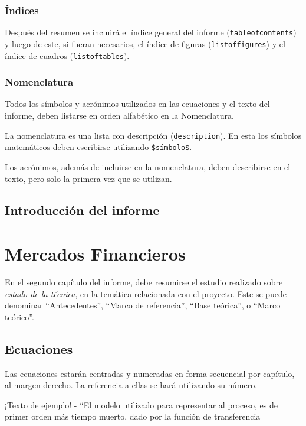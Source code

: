 \subsection{Índices}
Después del resumen se incluirá el índice general  del informe (\texttt{tableofcontents}) y luego de este, si fueran necesarios, el índice de figuras (\texttt{listoffigures}) y el índice de cuadros (\texttt{listoftables}).

\subsection{Nomenclatura}
Todos los símbolos y acrónimos utilizados en las ecuaciones y el texto del informe, deben listarse en orden alfabético en la Nomenclatura.

La nomenclatura es una lista con descripción (\texttt{description}).  En esta los símbolos matemáticos deben escribirse utilizando \texttt{\$símbolo\$}.

Los acrónimos, además de incluirse en la nomenclatura, deben describirse en el texto, pero solo la primera vez que se utilizan.

\section{Introducción del informe}


\chapter{Mercados Financieros} \label{sec:L02}
En el segundo capítulo del informe, debe resumirse el estudio realizado sobre \emph{estado de la técnica}, en la temática relacionada con el proyecto.  Este se puede denominar ``Antecedentes'', ``Marco de referencia'', ``Base teórica'', o ``Marco teórico''.
 
\section{Ecuaciones}
Las ecuaciones estarán centradas y numeradas en forma secuencial por capítulo, al margen derecho.  La referencia a ellas se hará utilizando su número.

¡Texto de ejemplo! - ``El modelo utilizado para representar al proceso, es de primer orden más tiempo muerto, dado por la función de transferencia

